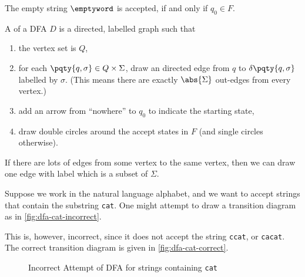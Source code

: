 \begin{example*}
    The empty string \(\emptyword\) is accepted, if and only if \(q_0 \in F\).
\end{example*}

\begin{definition}
    A  of a DFA \(D\) is a directed, labelled graph such that
    \begin{enumerate}[label=(\arabic*)]
        \item the vertex set is \(Q\),
        \item for each \(\pqty{q, \sigma} \in Q \times \Sigma\), draw an directed edge from \(q\) to \(\delta\pqty{q, \sigma}\) labelled by \(\sigma\). (This means there are exactly \(\abs{\Sigma}\) out-edges from every vertex.)
        \item add an arrow from ``nowhere'' to \(q_0\) to indicate the starting state,
        \item draw double circles around the accept states in \(F\) (and single circles otherwise).
    \end{enumerate}

    If there are lots of edges from some vertex to the same vertex, then we can draw one edge with label which is a subset of \(\Sigma\).
\end{definition}

\begin{example*}
    Suppose we work in the natural language alphabet, and we want to accept strings that contain the substring \texttt{cat}. One might attempt to draw a transition diagram as in \autoref{fig:dfa-cat-incorrect}.

    This is, however, incorrect, since it does not accept the string \texttt{ccat}, or \texttt{cacat}. The correct transition diagram is given in \autoref{fig:dfa-cat-correct}.
\end{example*}

\begin{figure}[ht!]
    \centering
    \caption{Incorrect Attempt of DFA for strings containing \texttt{cat}}
    \label{fig:dfa-cat-incorrect}
\end{figure}

